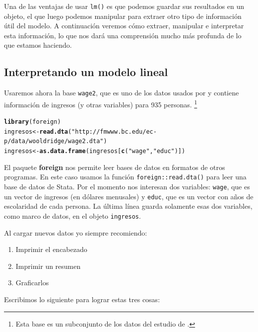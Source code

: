 \documentclass{article}\usepackage[]{graphicx}\usepackage[]{color}
\makeatletter
\newcommand{\hlstr}[1]{\textcolor[rgb]{0.192,0.494,0.8}{#1}}%
\newcommand{\hlstd}[1]{\textcolor[rgb]{0.345,0.345,0.345}{#1}}%
\newcommand{\hlkwb}[1]{\textcolor[rgb]{0.69,0.353,0.396}{#1}}%
\newcommand{\hlkwd}[1]{\textcolor[rgb]{0.737,0.353,0.396}{\textbf{#1}}}%
\newenvironment{kframe}{%
 \def\at@end@of@kframe{}%
 \ifinner\ifhmode%
  \def\at@end@of@kframe{\end{minipage}}%
  \begin{minipage}{\columnwidth}%
 \fi\fi%
 \def\FrameCommand##1{\hskip\@totalleftmargin \hskip-\fboxsep
 \colorbox{shadecolor}{##1}\hskip-\fboxsep
     \hskip-\linewidth \hskip-\@totalleftmargin \hskip\columnwidth}%
 \MakeFramed {\advance\hsize-\width
   \@totalleftmargin\z@ \linewidth\hsize
   \@setminipage}}%
 {\par\unskip\endMakeFramed%
 \at@end@of@kframe}
\newenvironment{knitrout}{}{} %
\newcommand*{\paq}[1]{\textbf{#1}}
\makeatother
\begin{document}
Una de las ventajas de usar \verb|lm()| es que podemos guardar sus resultados en un objeto, el que luego podemos manipular para extraer otro tipo de información útil del modelo. A continuación veremos cómo extraer, manipular e interpretar esta información, lo que nos dará una comprensión mucho más profunda de lo que estamos haciendo.


\subsection{Interpretando un modelo lineal}

Usaremos ahora la base \verb|wage2|, que es uno de los datos usados por \textcite{wooldridge_introductory_2013} y contiene información de ingresos (y otras variables) para 935 personas. \footnote{Esta base es un subconjunto de los datos del estudio de \textcite{blackburn_unobserved_1992}.}

\begin{knitrout}
\color{fgcolor}\begin{kframe}
\begin{alltt}
\hlkwd{library}\hlstd{(foreign)}
\hlstd{ingresos} \hlkwb{<-} \hlkwd{read.dta}\hlstd{(}\hlstr{"http://fmwww.bc.edu/ec-p/data/wooldridge/wage2.dta"}\hlstd{)}
\hlstd{ingresos} \hlkwb{<-} \hlkwd{as.data.frame}\hlstd{(ingresos[}\hlkwd{c}\hlstd{(}\hlstr{"wage"}\hlstd{,}\hlstr{"educ"}\hlstd{)])}
\end{alltt}
\end{kframe}
\end{knitrout}

El paquete \paq{foreign} nos permite leer bases de datos en formatos de otros programas. En este caso usamos la función \verb|foreign::read.dta()| para leer una base de datos de Stata.
Por el momento nos interesan dos variables: \verb|wage|, que es un vector de ingresos (en dólares menusales) y \verb|educ|, que es un vector con años de escolaridad de cada persona. La última línea guarda solamente esas dos variables, como marco de datos, en el objeto \verb|ingresos|.

Al cargar nuevos datos yo siempre recomiendo:
\begin{enumerate}
\item Imprimir el encabezado
\item Imprimir un resumen
\item Graficarlos
\end{enumerate}

Escribimos lo siguiente para lograr estas tres cosas:
\end{document}
